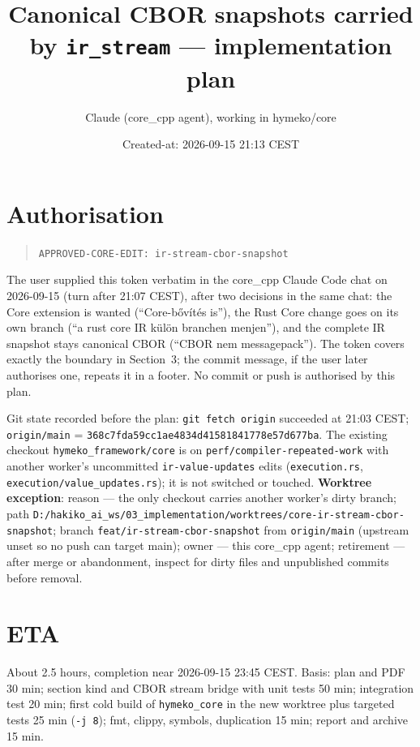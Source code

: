 \documentclass[11pt,a4paper]{article}
\title{Canonical CBOR snapshots carried by \texttt{ir\_stream} --- implementation plan}
\author{Claude (core\_cpp agent), working in hymeko/core}
\date{Created-at: 2026-09-15 21:13 CEST}
\begin{document}
\sloppy
\maketitle

\section*{Authorisation}

\begin{quote}
\texttt{APPROVED-CORE-EDIT: ir-stream-cbor-snapshot}
\end{quote}

The user supplied this token verbatim in the core\_cpp Claude Code chat on 2026-09-15 (turn after 21:07 CEST),
after two decisions in the same chat: the Core extension is wanted (``Core-bővítés is''), the Rust Core change goes on
its own branch (``a rust core IR külön branchen menjen''), and the complete IR snapshot stays canonical CBOR
(``CBOR nem messagepack''). The token covers exactly the boundary in Section~3; the commit message, if the user later
authorises one, repeats it in a footer. No commit or push is authorised by this plan.

Git state recorded before the plan: \texttt{git fetch origin} succeeded at 21:03 CEST;
\texttt{origin/main} = \texttt{368c7fda59cc1ae4834d41581841778e57d677ba}. The existing checkout
\texttt{hymeko\_framework/core} is on \texttt{perf/compiler-repeated-work} with another worker's uncommitted
\texttt{ir-value-updates} edits (\texttt{execution.rs}, \texttt{execution/value\_updates.rs}); it is not switched or
touched. \textbf{Worktree exception}: reason --- the only checkout carries another worker's dirty branch; path
\texttt{D:/hakiko\_ai\_ws/03\_implementation/worktrees/core-ir-stream-cbor-snapshot}; branch
\texttt{feat/ir-stream-cbor-snapshot} from \texttt{origin/main} (upstream unset so no push can target main); owner ---
this core\_cpp agent; retirement --- after merge or abandonment, inspect for dirty files and unpublished commits
before removal.

\section*{ETA}

About 2.5 hours, completion near 2026-09-15 23:45 CEST. Basis: plan and PDF 30 min; section kind and CBOR stream
bridge with unit tests 50 min; integration test 20 min; first cold build of \texttt{hymeko\_core} in the new worktree
plus targeted tests 25 min (\texttt{-j 8}); fmt, clippy, symbols, duplication 15 min; report and archive 15 min.
\end{document}
